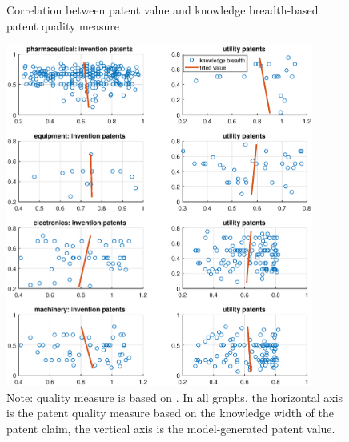 \documentclass[English]{article}
\begin{document}
\begin{center}
\begin{figure}[H]
\caption{Correlation between patent value and knowledge breadth-based patent quality measure}
\label{F5}
\begin{centering}
\includegraphics[width=0.9\textwidth]{patcorr.eps}
\par\end{centering}
\caption*{\small{}Note: quality measure is based on \citet{Dang2015}. In all graphs, the horizontal axis is the patent quality measure based on the knowledge width of the patent claim, the vertical axis is the model-generated patent value.}{\small \par}
\end{figure}
\par\end{center}
\end{document}

